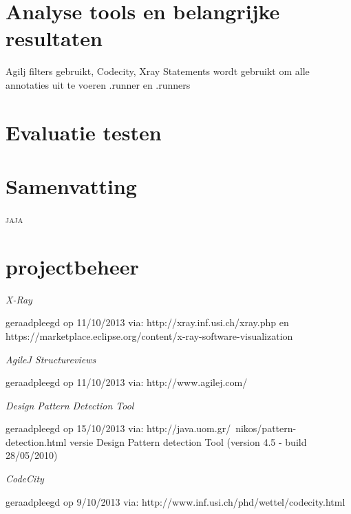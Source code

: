 \documentclass[a4paper, 11pt]{article}
\begin{document}
\section{Analyse tools en belangrijke resultaten}
Agilj filters gebruikt, Codecity, Xray
Statements wordt gebruikt om alle annotaties uit te voeren
.runner en .runners

\section{Evaluatie testen}

\section{Samenvatting}

\textsc{jaja}
\section{projectbeheer}


\newpage
\begin{flushleft}
\begin{thebibliography}{4}

\textit{X-Ray}
\begin{scriptsize}
geraadpleegd op 11/10/2013 via: \mbox{http://xray.inf.usi.ch/xray.php} en \mbox{https://marketplace.eclipse.org/content/x-ray-software-visualization}
\end{scriptsize}

\textit{AgileJ Structureviews}
\begin{scriptsize}
geraadpleegd op 11/10/2013 via: \mbox{http://www.agilej.com/}
\end{scriptsize}

\textit{Design Pattern Detection Tool}
\begin{scriptsize}
geraadpleegd op 15/10/2013 via: \mbox{http://java.uom.gr/~nikos/pattern-detection.html} versie  Design Pattern detection Tool (version 4.5 - build 28/05/2010)
\end{scriptsize}

\textit{CodeCity}
\begin{scriptsize}
geraadpleegd op 9/10/2013 via: \mbox{http://www.inf.usi.ch/phd/wettel/codecity.html} 
\end{scriptsize}

\end{thebibliography}
\end{flushleft}
\end{document}

